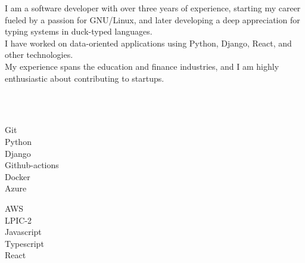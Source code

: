 \documentclass[9pt]{developercv}
\begin{document}
\begin{minipage}[t]{1\textwidth}
	\vspace{-\baselineskip}
	I am a software developer with over three years of experience, starting my career fueled by a passion for GNU/Linux, and later developing a deep appreciation for typing systems in duck-typed languages. \\
	I have worked on data-oriented applications using Python, Django, React, and other technologies. \\
	My experience spans the education and finance industries, and I am highly enthusiastic about contributing to startups.
\end{minipage}

\\\\
\begin{minipage}[t]{0.49\textwidth}
	\Large
	\vspace{-\baselineskip}

	\faCircle \; {Git}\\
	\faCircle \; {Python}\\
	\faCircle \; {Django}\\
	\faCircle \; {Github-actions}\\
	\faCircle \; {Docker}\\
	\faCircle \; {Azure}\\
\end{minipage}
\begin{minipage}[t]{0.50\textwidth}
	\Large
	\vspace{-\baselineskip}

	\faCircle \; {AWS}\\
	\faCircle \; {LPIC-2}\\
	\faCircle \; {Javascript}\\
	\faCircle \; {Typescript}\\
	\faCircle \; {React}\\
\end{minipage}
\end{document}
